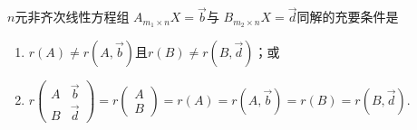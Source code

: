 \begin{theorem}
    $n$元非齐次线性方程组 $A_{m_1 \times n}X=\vec{b}$与 $B_{m_2 \times n}X=\vec{d}$同解的充要条件是
    \begin{enumerate}
        \item $r(A)\neq r(A,\vec{b})$且$r(B)\neq r(B,\vec{d})$；或

        \item $r\begin{pmatrix}
                      A & \vec{b} \\ B & \vec{d}
                  \end{pmatrix}=r\begin{pmatrix}
                      A \\ B
                  \end{pmatrix}=r(A)=r(A,\vec{b})=r(B)=r(B,\vec{d})$.
    \end{enumerate}
\end{theorem}

